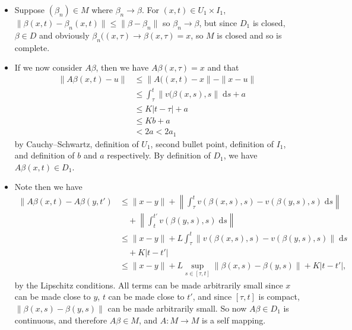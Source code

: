 \documentclass[letter-paper]{tufte-book}
\newenvironment{proof}[1][Proof]{\begin{trivlist}
\item[\hskip \labelsep {\bfseries #1}]}{\end{trivlist}}
\begin{document}
\begin{proof}
\begin{itemize}
    \item Suppose $(\beta_n) \in M$ where $\beta_n \to \beta$. For
    $(x, t) \in U_1 \times I_1$, $\|\beta(x, t) -
    \beta_n (x, t)\| \leq \|\beta - \beta_n\|$ so $\beta_n \to
    \beta$, but since $D_1$ is closed, $\beta \in D$ and obviously
    $\beta_n((x, \tau) \to \beta(x, \tau) =
    x$, so $M$ is closed and so is complete.
    
    \item If we now consider $A\beta$, then we have $A\beta(x,
    \tau) = x$ and that
    \begin{align*}
      \|A\beta(x, t) - u\| & \leq \|A((x, t) - x\|  - \| x - u\|\\
        &\leq \int_\tau^t \|v(\beta(x, s), s\|\; \mathrm{d}s + a\\
        &\leq K|t - \tau| + a\\
        &\leq Kb + a\\
        &< 2a < 2a_1 
    \end{align*}
    by Cauchy--Schwartz, definition of $U_1$, second bullet point, definition of
    $I_1$, and definition of $b$ and $a$ respectively. By definition of $D_1$,
    we have $A\beta(x, t) \in D_1$.
    
    \item Note then we have
    \begin{align*}
      \|A\beta(x, t) - A\beta(y, t') &\leq \|x - y\| + \left\|\int_\tau^t v(\beta(x, s), s) - v(\beta(y, s), s)\; \mathrm{d}s\right\|\\
        &\quad + \left\|\int_t^{t'} v(\beta(y, s), s)\; \mathrm{d}s\right\|\\
      &\leq \|x - y\| + L\int_\tau^t \left\|v(\beta(x, s), s) - v(\beta(y, s), s)\right\|\; \mathrm{d}s\\
        &\quad + K|t - t'|\\
      &\leq \|x - y\| + L \sup_{s\in[\tau, t]}\|\beta(x, s) - \beta(y, s)\| + K|t - t'|,
    \end{align*}
    by the Lipschitz conditions. All terms can be made arbitrarily small since
    $x$ can be made close to $y$, $t$ can be made close to $t'$, and since
    $[\tau, t]$ is compact, $\|\beta(x, s) - \beta(y, s)\|$ can be made
    arbitrarily small. So now $A\beta \in D_1$ is continuous, and therefore
    $A\beta \in M$, and $A : M \to M$ is a self mapping.
    

\end{itemize}
\end{proof}
\end{document}
